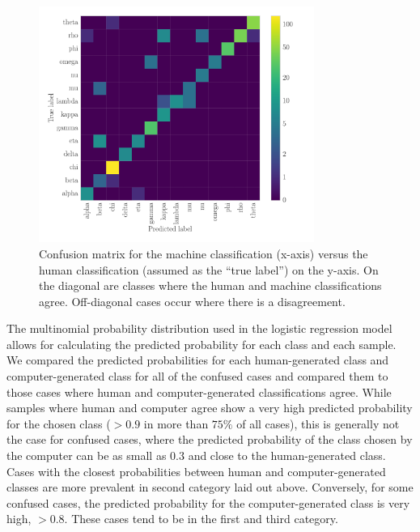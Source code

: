 \documentclass[12pt]{emulateapj}
\begin{document}
\begin{figure}[htbp]
\begin{center}
\includegraphics[width=9cm]{grs1915_supervised_cm.pdf}
\caption{Confusion matrix for the machine classification (x-axis) versus the human classification (assumed as the ``true label'') on the 
y-axis. On the diagonal are classes where the human and machine classifications agree. Off-diagonal cases occur where there is a 
disagreement.} 
\label{fig:confusion_matrix}
\end{center}
\end{figure}

The multinomial probability distribution used in the logistic regression model allows for calculating the predicted probability for each class and each sample. We compared the predicted probabilities for each human-generated class and computer-generated class for all of the confused cases and compared them to those cases where human and computer-generated classifications agree. While samples where human and computer agree show a very high predicted probability for the chosen class ($>0.9$ in more than $75\%$ of all cases), this is generally not the case for confused cases, where the predicted probability of the class chosen by the computer can be as small as $0.3$ and close to the human-generated class. Cases with the closest probabilities between human and computer-generated classes 
are more prevalent in second category laid out above. Conversely, for some confused cases, the predicted probability for the computer-generated class is very high, $>0.8$. These cases tend to be in the first and third category. 
\end{document}
